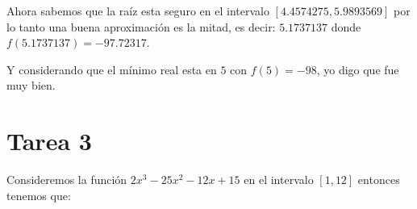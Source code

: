 \documentclass[12pt, fleqn]{article}                            %
\theoremstyle{break}                                            %
\begin{document}
            Ahora sabemos que la raíz esta seguro en el intervalo $[4.4574275, 5.9893569]$ por lo tanto
            una buena aproximación es la mitad, es decir: $5.1737137$ donde \\ $f(5.1737137) = -97.72317$.

            Y considerando que el mínimo real esta en $5$ con $f(5) = -98$, yo digo que fue muy bien.

    \clearpage
    \section{Tarea 3}

        Consideremos la función $2x^3 - 25x^2 - 12x + 15$ en el intervalo $[1, 12]$ entonces tenemos que:
        
\end{document}
